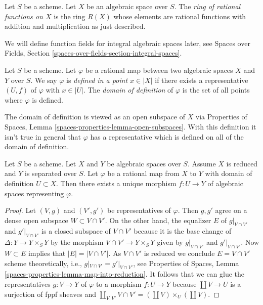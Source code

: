 \begin{definition}
\label{definition-ring-of-rational-functions}
Let $S$ be a scheme.
Let $X$ be an algebraic space over $S$.
The {\it ring of rational functions on $X$}
is the ring $R(X)$ whose elements are rational functions with
addition and multiplication as just described.
\end{definition}

\noindent
We will define function fields for integral algebraic spaces later, see
Spaces over Fields, Section \ref{spaces-over-fields-section-integral-spaces}.

\begin{definition}
\label{definition-domain-of-definition}
Let $S$ be a scheme. Let $\varphi$ be a rational map between two
algebraic spaces $X$ and $Y$ over $S$. We say
$\varphi$ is {\it defined in a point $x \in |X|$} if there exists a
representative $(U, f)$ of $\varphi$ with $x \in |U|$. The
{\it domain of definition} of $\varphi$ is the set of all points
where $\varphi$ is defined.
\end{definition}

\noindent
The domain of definition is viewed as an open subspace of $X$ via
Properties of Spaces, Lemma \ref{spaces-properties-lemma-open-subspaces}.
With this definition it isn't true in general that $\varphi$ has a
representative which is defined on all of the domain of definition.

\begin{lemma}
\label{lemma-rational-map-from-reduced-to-separated}
Let $S$ be a scheme. Let $X$ and $Y$ be algebraic spaces over $S$.
Assume $X$ is reduced and $Y$ is separated over $S$. Let
$\varphi$ be a rational map from $X$ to $Y$ with domain of definition
$U \subset X$. Then there exists a unique morphism $f : U \to Y$
of algebraic spaces representing $\varphi$.
\end{lemma}

\begin{proof}
Let $(V, g)$ and $(V', g')$ be representatives of $\varphi$. Then
$g, g'$ agree on a dense open subspace $W \subset V \cap V'$.
On the other hand, the equalizer $E$ of $g|_{V \cap V'}$ and $g'|_{V \cap V'}$
is a closed subspace of $V \cap V'$ because it is the base change
of $\Delta : Y \to Y \times_S Y$ by the morphism
$V \cap V' \to Y \times_S Y$ given by $g|_{V \cap V'}$ and $g'|_{V \cap V'}$.
Now $W \subset E$ implies that $|E| = |V \cap V'|$. As $V \cap V'$
is reduced we conclude $E = V \cap V'$ scheme theoretically, i.e.,
$g|_{V \cap V'} = g'|_{V \cap V'}$, see
Properties of Spaces, Lemma \ref{spaces-properties-lemma-map-into-reduction}.
It follows that we can glue the representatives $g : V \to Y$ of $\varphi$
to a morphism $f : U \to Y$ because $\coprod V \to U$ is a surjection of
fppf sheaves and
$\coprod_{V, V'} V \cap V' = (\coprod V) \times_U (\coprod V)$.
\end{proof}

